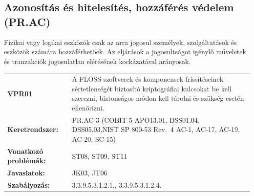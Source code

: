 \documentclass[12pt,magyar,a4paper,oneside]{scrreprt}
\begin{document}
\hypertarget{azonosuxedtuxe1s-uxe9s-hitelesuxedtuxe9s-hozzuxe1fuxe9ruxe9s-vuxe9delem-pr.ac}{%
\subsection{Azonosítás és hitelesítés, hozzáférés védelem
(PR.AC)}\label{azonosuxedtuxe1s-uxe9s-hitelesuxedtuxe9s-hozzuxe1fuxe9ruxe9s-vuxe9delem-pr.ac}}

Fizikai vagy logikai eszközök csak az arra jogosul személyek,
szolgáltatások és eszközök számára hozzáférhetőek. Az eljárások a
jogosultságot igénylő műveletek és tranzakciók jogosulatlan elérésének
kockázatával arányosak.

\begin{longtable}[]{@{}ll@{}}
\toprule
\endhead
\begin{minipage}[t]{0.16\columnwidth}\raggedright
\textbf{VPR01}\strut
\end{minipage} & \begin{minipage}[t]{0.79\columnwidth}\raggedright
A FLOSS szoftverek és komponensek frissítéseinek sértetlenségét
biztosító kriptográfiai kulcsokat be kell szerezni, biztonságos módon
kell tárolni és szükség esetén ellenőrizni.\strut
\end{minipage}\tabularnewline
\begin{minipage}[t]{0.16\columnwidth}\raggedright
\textbf{Keretrendszer:}\strut
\end{minipage} & \begin{minipage}[t]{0.79\columnwidth}\raggedright
PR.AC-3 (COBIT 5 APO13.01, DSS01.04, DSS05.03,NIST SP 800-53 Rev.~4
AC-1, AC-17, AC-19, AC-20, SC-15)\strut
\end{minipage}\tabularnewline
\begin{minipage}[t]{0.16\columnwidth}\raggedright
\textbf{Vonatkozó problémák:}\strut
\end{minipage} & \begin{minipage}[t]{0.79\columnwidth}\raggedright
ST08, ST09, ST11\strut
\end{minipage}\tabularnewline
\begin{minipage}[t]{0.16\columnwidth}\raggedright
\textbf{Javaslatok:}\strut
\end{minipage} & \begin{minipage}[t]{0.79\columnwidth}\raggedright
JK03, JT06\strut
\end{minipage}\tabularnewline
\begin{minipage}[t]{0.16\columnwidth}\raggedright
\textbf{Szabályozás:}\strut
\end{minipage} & \begin{minipage}[t]{0.79\columnwidth}\raggedright
3.3.9.5.3.1.2.1., 3.3.9.5.3.1.2.4.\strut
\end{minipage}\tabularnewline
\bottomrule
\end{longtable}
\end{document}
